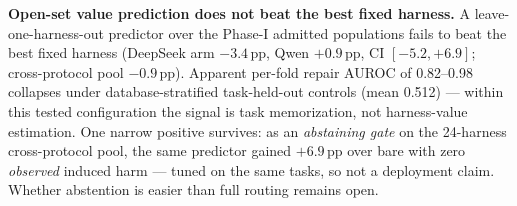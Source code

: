 \textbf{Open-set value prediction does not beat the best fixed harness.} A
leave-one-harness-out predictor over the Phase-I admitted populations fails to beat
the best fixed harness (DeepSeek arm $-3.4$\,pp, Qwen $+0.9$\,pp, CI
$[-5.2, +6.9]$; cross-protocol pool $-0.9$\,pp). Apparent per-fold repair AUROC of
0.82--0.98 collapses under database-stratified task-held-out controls (mean 0.512)
--- within this tested configuration the signal is task memorization, not
harness-value estimation. One narrow positive survives: as an
\emph{abstaining gate} on the 24-harness cross-protocol pool, the same
predictor gained $+6.9$\,pp over bare with zero \emph{observed} induced
harm --- tuned on the same tasks, so not a deployment claim. Whether
abstention is easier than full routing remains open.
